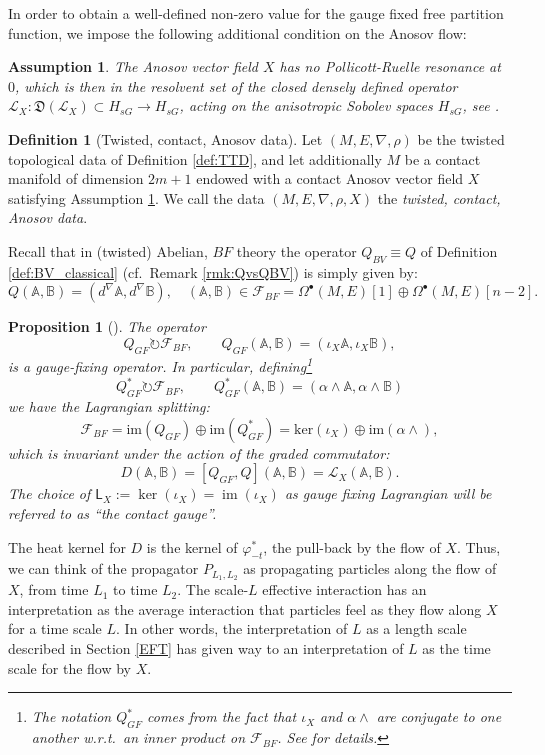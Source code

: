 \documentclass[reqno]{amsart}
\newtheorem{prop}[thm]{Proposition}
\newtheorem{assumption}{Assumption}
\theoremstyle{definition}
\newtheorem{defn}[thm]{Definition}
\theoremstyle{remark}
\renewcommand{\phi}{\varphi}
\newcommand{\A}{\mathbb{A}}
\newcommand{\B}{\mathbb{B}}
\renewcommand{\d}{d^\nabla}
\newcommand{\F}{\mathcal{F}}
\newcommand{\sfL}{\mathsf{L}}
\renewcommand{\L}{\mathcal{L}}
\DeclareMathOperator{\im}{im}
\begin{document}
In order to obtain a well-defined non-zero value for the gauge fixed free partition function, we impose the following additional condition on the Anosov flow:
\begin{assumption}\label{ass:noresonance}
The Anosov vector field $X$ has no Pollicott-Ruelle resonance at $0$, which is then in the resolvent set of the closed densely defined operator $\L_X: \mathfrak{D}(\L_X)\subset H_{sG} \to H_{sG}$, acting on the anisotropic Sobolev spaces $H_{sG}$, see \cite[Section 3.1]{DyatlovZworski_RuelleZeta}. 
\end{assumption}


\begin{defn}[Twisted, contact, Anosov data]\label{def:TCAD}
    Let $(M,E,\nabla,\rho)$ be the twisted topological data of Definition \ref{def:TTD}, and let additionally $M$ be a contact manifold of dimension $2m+1$ endowed with a contact Anosov vector field $X$ satisfying Assumption \ref{ass:noresonance}. We call the data $(M,E,\nabla,\rho,X)$ the \emph{twisted, contact, Anosov data}.
\end{defn}

Recall that in (twisted) Abelian, $BF$ theory the operator $Q_{BV}\equiv Q$ of Definition \ref{def:BV_classical} (cf.\ Remark \ref{rmk:QvsQBV}) is simply given by:
$$Q(\A,\B) = (\d\A,\d\B), \quad (\A,\B) \in \F_{BF} = \Omega^\bullet(M,E)[1] \oplus \Omega^\bullet(M,E)[n-2].$$
\begin{prop}[\cite{hadfield_kandel_schiavina,Schiavina_Stucker1}]\label{prop:GFoperator}
The operator
\[
Q_{GF} \circlearrowright \F_{BF}, \qquad Q_{GF} (\A,\B) = (\iota_X\A,\iota_X\B),
\]
is a gauge-fixing operator. In particular, defining\footnote{The notation $Q_{GF}^*$ comes from the fact that $\iota_X$ and $\alpha\wedge$ are conjugate to one another w.r.t.\ an inner product on $\F_{BF}$. See \cite{Schiavina_Stucker1} for details.}
\[
Q_{GF}^* \circlearrowright \F_{BF}, \qquad Q_{GF}^* (\A,\B) = (\alpha\wedge\A,\alpha\wedge\B)
\]
we have the Lagrangian splitting:
\[
\F_{BF}=\mathrm{im}(Q_{GF}) \oplus \mathrm{im}(Q_{GF}^*) = \mathrm{ker}(\iota_X) \oplus \mathrm{im}(\alpha\wedge),
\]
which is invariant under the action of the graded commutator:
\[D(\A,\B) = [Q_{GF},Q](\A,\B) = \L_X(\A,\B).\]
The choice of $\sfL_X := \ker(\iota_X) = \im(\iota_X)$ as gauge fixing Lagrangian will be referred to as ``the contact gauge''.
\end{prop}
 

\begin{rmk}
The heat kernel for $D$ is the kernel of $\phi_{-t}^*$, the pull-back by the flow of $X$. %
Thus, we can think of the propagator $P_{L_1,L_2}$ as propagating particles along the flow of $X$, from time $L_1$ to time $L_2$. The scale-$L$ effective interaction has an interpretation as the average interaction that particles feel as they flow along $X$ for a time scale $L$. In other words, the interpretation of $L$ as a length scale described in Section \ref{EFT} has given way to an interpretation of $L$ as the time scale for the flow by $X$.
\end{rmk}
\end{document}
